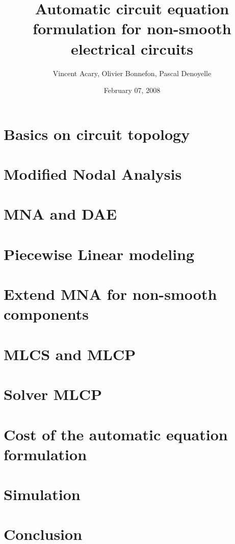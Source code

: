 \documentclass[8pt,xcolor*pst]{beamer}
\title{Automatic circuit equation formulation for non-smooth electrical circuits}
\author{Vincent Acary, Olivier Bonnefon, Pascal Denoyelle}
\date{February 07, 2008}
\institute{INRIA Rh\^one-Alpes}
\begin{document}
\frame{\titlepage}
\frame{\tableofcontents}%
\section{Basics on circuit topology}

\section{Modified Nodal Analysis}

\section{MNA and DAE}

\section{Piecewise Linear modeling}

\section{Extend MNA for non-smooth components}

\section{MLCS and MLCP}

\section{Solver MLCP}


\section{Cost of the automatic equation formulation}

\section{Simulation}

\section{Conclusion}



\def\newblock{}
\end{document}
